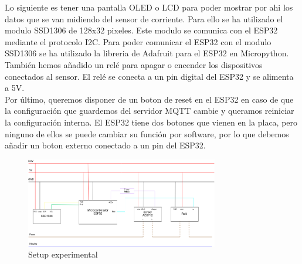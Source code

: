 \begin{titlepage}
Lo siguiente es tener una pantalla OLED o LCD para poder mostrar por ahi los datos que se van midiendo del sensor de corriente. Para ello se ha utilizado el modulo SSD1306 de 128x32 pixeles. Este modulo se comunica con el ESP32 mediante el protocolo I2C. Para poder comunicar el ESP32 con el modulo SSD1306 se ha utilizado la libreria de Adafruit para el ESP32 en Micropython.\\

También hemos añadido un relé para apagar o encender los dispositivos conectados al sensor. El relé se conecta a un pin digital del ESP32 y se alimenta a 5V.\\

Por último, queremos disponer de un boton de reset en el ESP32 en caso de que la configuración que guardemos del servidor MQTT cambie y queramos reiniciar la configuración interna. El ESP32 tiene dos botones que vienen en la placa, pero ninguno de ellos se puede cambiar su función por software, por lo que debemos añadir un boton externo conectado a un pin del ESP32. \\

\begin{figure}[h!]
	\centering
	\includegraphics[width=0.75\textwidth]{imagenes/setup_experimental.png}
	\caption{Setup experimental}
\end{figure}

\end{titlepage}
